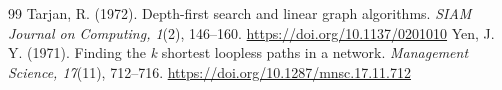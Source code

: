 \documentclass[11pt,a4paper]{article}
\begin{document}
{\begin{thebibliography}{99}
 Tarjan, R. (1972). Depth-first search and linear graph algorithms. \textit{SIAM Journal on Computing, 1}(2), 146--160. \url{https://doi.org/10.1137/0201010}
 Yen, J. Y. (1971). Finding the \textit{k} shortest loopless paths in a network. \textit{Management Science, 17}(11), 712--716. \url{https://doi.org/10.1287/mnsc.17.11.712}
\end{thebibliography}}
\end{document}
